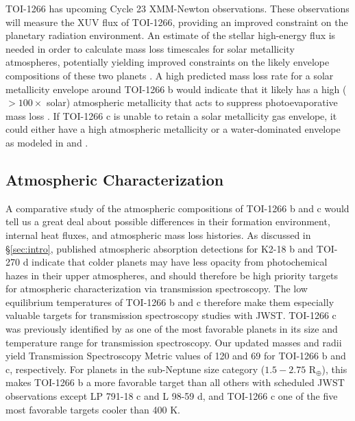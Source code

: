 \documentclass[twocolumn]{aastex631}
\begin{document}
TOI-1266 has upcoming Cycle 23 XMM-Newton observations. These observations will measure the XUV flux of TOI-1266, providing an improved constraint on the planetary radiation environment. An estimate of the stellar high-energy flux is needed in order to calculate mass loss timescales for solar metallicity atmospheres, potentially yielding improved constraints on the likely envelope compositions of these two planets \citep[e.g.,][]{Diamond-Lowe2022}. A high predicted mass loss rate for a solar metallicity envelope around TOI-1266 b would indicate that it likely has a high ($>100\times$ solar) atmospheric metallicity that acts to suppress photoevaporative mass loss \citep{Zhang2022}. If TOI-1266 c is unable to retain a solar metallicity gas envelope, it could either have a high atmospheric metallicity or a water-dominated envelope as modeled in \cite{Harman_2022} and \cite{Yoshida2022}.

\subsection{Atmospheric Characterization}

A comparative study of the atmospheric compositions of TOI-1266 b and c would tell us a great deal about possible differences in their formation environment, internal heat fluxes, and atmospheric mass loss histories.  As discussed in \S\ref{sec:intro}, published atmospheric absorption detections for K2-18 b and TOI-270 d \citep{Madhusudhan2023,Benneke2024} indicate that colder planets may have less opacity from photochemical hazes in their upper atmospheres, and should therefore be high priority targets for atmospheric characterization via transmission spectroscopy. The low equilibrium temperatures of TOI-1266 b and c therefore make them especially valuable targets for transmission spectroscopy studies with JWST. 
TOI-1266 c was previously identified by \cite{Hord2024} as one of the most favorable planets in its size and temperature range for transmission spectroscopy. Our updated masses and radii yield Transmission Spectroscopy Metric \citep[TSM,][]{Kempton2018} values of 120 and 69 for TOI-1266 b and c, respectively. For planets in the sub-Neptune size category ($1.5 - 2.75$ R$_{\oplus}$), this makes TOI-1266 b a more favorable target than all others with scheduled JWST observations except LP 791-18 c and L 98-59 d, and TOI-1266 c one of the five most favorable targets cooler than 400 K. 
\end{document}
